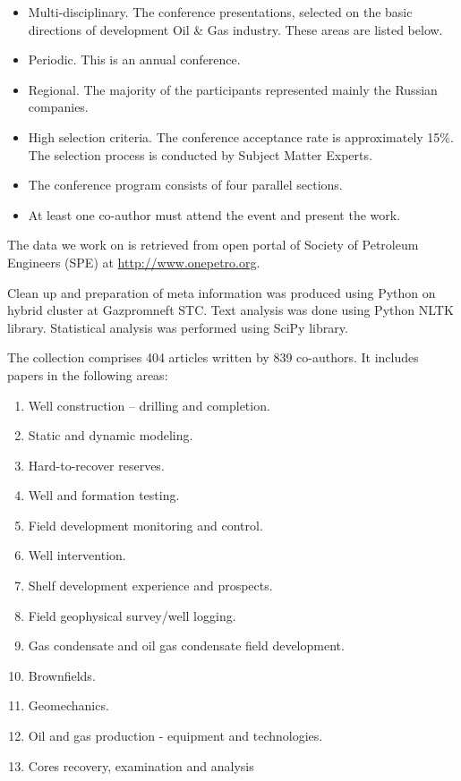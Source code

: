 \documentclass[12pt]{report}
\theoremstyle{definition}
\begin{document}
\begin{itemize}
	\item  Multi-disciplinary. The conference presentations, selected on the basic directions of development Oil \& Gas industry. These areas are listed below.
	\item  Periodic. This is an annual conference.
	\item  Regional. The majority of the participants represented mainly the Russian companies.
	\item  High selection criteria. The conference acceptance rate is approximately 15\%. The selection process is conducted by Subject Matter Experts.
	\item The conference program consists of four parallel sections.
	\item At least one co-author must attend the event and present the work.
\end{itemize}

The data we work on is retrieved from open portal of Society of  Petroleum Engineers (SPE) at  \url{http://www.onepetro.org}. 

Clean up and preparation of meta information was produced using Python on hybrid cluster at Gazpromneft STC. Text analysis was done using Python NLTK library. Statistical analysis was performed using SciPy library.

The collection comprises 404 articles written by 839 co-authors. It includes papers in the following areas:
\begin{enumerate}
	\item Well construction – drilling and completion.
	\item Static and dynamic modeling.
	\item Hard-to-recover reserves.
	\item Well and formation testing.
	\item Field development monitoring and control.
	\item Well intervention.
	\item Shelf development experience and prospects.
	\item Field geophysical survey/well logging.
	\item Gas condensate and oil gas condensate field development.
	\item Brownfields.
	\item Geomechanics.
	\item Oil and gas production - equipment and technologies.
	\item Cores recovery, examination and analysis
\end{enumerate}
\end{document}
